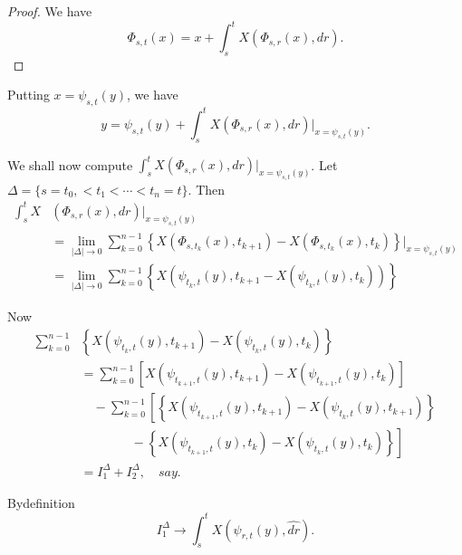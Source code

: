 \begin{proof}%
  We have
  $$
  \Phi_{s,t}(x) = x + \int_s^t X (\Phi_{s,r}(x), dr). 
  $$
\end{proof}

Putting $x = \psi_{s, t}(y)$, we have
\begin{equation*}
  y = \psi_{s, t}(y) + \int_s^t X(\Phi_{s, r}(x), dr)|_{x= \psi_{s,t}
    (y)}. \tag{2.6.5}\label{c2:eq2.6.5} 
\end{equation*}

We shall now compute $\int_s^t X(\Phi_{s, r}(x), dr)|_{x =
  \psi_{s,t}(y)}$. Let $\Delta = \{ s = t_0, <t_1 < \cdots < t_n = t
\}$. Then  
\begin{align*}
  \int_s^t X & (\Phi_{s, r}(x), dr)|_{x = \psi_{s, t}(y)}\\ 
  & =
  \lim_{|\Delta|\rightarrow 0} \sum_{k = 0}^{n-1} \left\{X(\Phi_{s,t_k}(x),
  t_{k+1}) - X(\Phi_{s, t_k}(x), t_k)\right\}|_{x = \psi_{s, t}(y)}\\ 
  & = \lim_{|\Delta| \rightarrow 0} \sum_{k =0}^{n-1} \left\{X(\psi_{t_k,
    t} (y), t_{k+1} -X(\psi_{t_k, t}
(y), t_k))\right\}\tag{2.6.6}\label{c2:eq2.6.6}
\end{align*}

Now
\begin{align*}
  \sum_{k=0}^{n-1} & \left\{X(\psi_{t_k,t}(y), t_{k+1})  
  -X(\psi_{t_k,t}(y), t_k)\right\}\\ 
  & =\sum_{k=0}^{n-1} \left[X(\psi_{t_{k+1}, t}(y),
    t_{k+1})-X(\psi_{t_{k+1},t}(y), t_k)\right] \\
  &\quad -\sum_{k=0}^{n-1} \left[\left\{X(  \psi_{t_{k+1},t}(y),
    t_{k+1})-X(\psi_{t_{k},t}(y), t_{k+1})\right\}\right.\\ 
   & \qquad \qquad-\left. \left\{  X(\psi_{t_{k+1},t}(y),
    t_{k})-X(\psi_{t_{k},t}(y), t_{k})\right\}\right]\\ 
    &= I_1^{\Delta} + I_2^{\Delta}, \quad say.
\end{align*}

By\pageoriginale definition
$$
I_1^{\Delta} \rightarrow \int_s^t X(\psi_{r, t}(y), \hat{dr}).
$$

